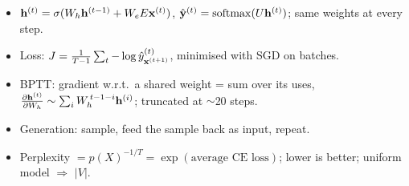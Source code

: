 \begin{nbsummary}
\begin{itemize}[nosep]
  \item $\mathbf{h}^{(t)} = \sigma(W_h \mathbf{h}^{(t-1)} + W_e E \mathbf{x}^{(t)})$,
        $\hat{\mathbf{y}}^{(t)} = \operatorname{softmax}(U \mathbf{h}^{(t)})$; same weights at every step.
  \item Loss: $J = \frac{1}{T-1}\sum_t -\log \hat y^{(t)}_{\mathbf{x}^{(t+1)}}$, minimised
        with SGD on batches.
  \item BPTT: gradient w.r.t.\ a shared weight = sum over its uses,
        $\frac{\partial \mathbf{h}^{(t)}}{\partial W_h} \sim \sum_{i} W_h^{\,t-1-i}
        \mathbf{h}^{(i)}$; truncated at $\sim$20 steps.
  \item Generation: sample, feed the sample back as input, repeat.
  \item Perplexity $= p(X)^{-1/T} = \exp(\text{average CE loss})$; lower is better;
        uniform model $\Rightarrow$ $|V|$.
\end{itemize}
\end{nbsummary}
